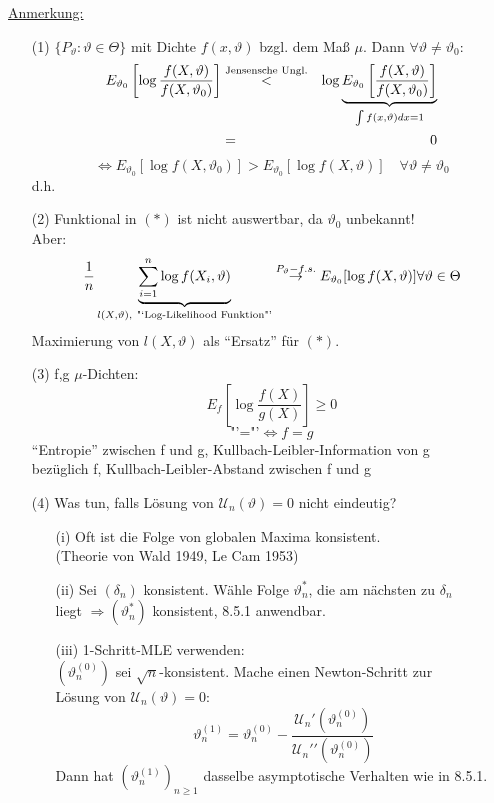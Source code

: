 \documentclass[a4paper,11pt,twoside,titlepage]{article}
\newcommand\UU{ \mathcal{U} } %
\begin{document}
\underline{Anmerkung:}
\begin{itemize}
\item[(1) ]$\{P_\vartheta:\vartheta\in\Theta\}$ mit Dichte $f(x,\vartheta)$ bzgl. dem Maß $\mu$. Dann $\forall\vartheta\neq\vartheta_0$:
\begin{eqnarray*}
E_{\vartheta_0}\left[\log \frac{f(X,\vartheta)}{f(X,\vartheta_0)}\right]&\stackrel{\textnormal{Jensensche Ungl.}}{<}&
\log \underbrace{E_{\vartheta_0}\left[\frac{f(X,\vartheta)}{f(X,\vartheta_0)}\right]}_{\int f(x,\vartheta)dx=1}\\
&=&0
\end{eqnarray*}
$$\Leftrightarrow E_{\vartheta_0}[\log f(X,\vartheta_0)]>E_{\vartheta_0}[\log f(X,\vartheta)]\quad \forall\vartheta\neq\vartheta_0$$
d.h. 
\item[(2) ]Funktional in $(\ast)$ ist nicht auswertbar, da $\vartheta_0$ unbekannt!\\
Aber: $$\frac1n\underbrace{\sum_{i=1}^n \log f(X_i,\vartheta)}_{l(X,\vartheta),\ \textnormal{"`Log-Likelihood Funktion"'}}
\stackrel{P_\vartheta -f.s.}{\rightarrow}E_{\vartheta_0}[\log f(X,\vartheta)]\forall\vartheta\in\Theta$$
Maximierung von $l(X,\vartheta)$ als "`Ersatz"' für $(\ast)$.
\item[(3) ]f,g $\mu$-Dichten:
$$E_f\left[\log \frac{f(X)}{g(X)}\right]\geq0$$
$$\mbox{"'="'} \Leftrightarrow f=g$$
"`Entropie"' zwischen f und g, Kullbach-Leibler-Information von g\\ bezüglich f, Kullbach-Leibler-Abstand zwischen f und g

\item[(4)] Was tun, falls Lösung von $\UU_n(\vartheta)=0$ nicht eindeutig?
\begin{itemize}
\item[(i)] Oft ist die Folge von globalen Maxima konsistent.\\ (Theorie von Wald 1949, Le Cam 1953)
\item[(ii)] Sei $(\delta_n)$ konsistent. Wähle Folge $\vartheta_n^\ast$, die am nächsten zu $\delta_n$\\ liegt $\Rightarrow (\vartheta_n^\ast)$ konsistent, 8.5.1 anwendbar.
\item[(iii)] 1-Schritt-MLE verwenden:\\
$(\vartheta_n^{(0)})$ sei $\sqrt n$-konsistent. Mache einen Newton-Schritt zur\\ Lösung von $\UU_n(\vartheta)=0$:
\[\vartheta_n^{(1)}=\vartheta_n^{(0)}-\frac{\UU_n'(\vartheta_n^{(0)})}{\UU_n'{'}(\vartheta_n^{(0)})}\]
Dann hat $(\vartheta_n^{(1)})_{n\geq1}$ dasselbe asymptotische Verhalten wie in 8.5.1.
\end{itemize}
\end{itemize}
\end{document}
